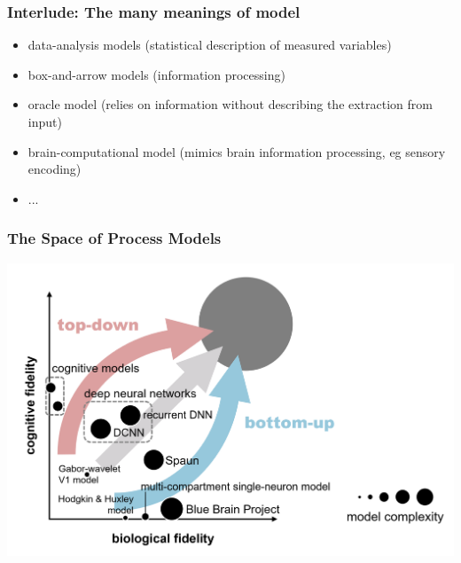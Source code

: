 \documentclass[
t, %
10pt, %
aspectratio=1610, %
ngerman,
english,
]{beamer}
\begin{document}
\begin{frame}
    \frametitle{Interlude: The many meanings of model}
    \begin{itemize}
     \item data-analysis models (statistical description of measured variables)
     \item box-and-arrow models (information processing)
     \item oracle model (relies on information without describing the extraction from input)
     \item brain-computational model (mimics brain information processing, eg sensory encoding)
     \item ...
    \end{itemize}
\end{frame}

\begin{frame}
    \frametitle{The Space of Process Models}
    \centering
    \includegraphics[height=0.7\textheight]{figures/figure3}
\end{frame}
\end{document}
